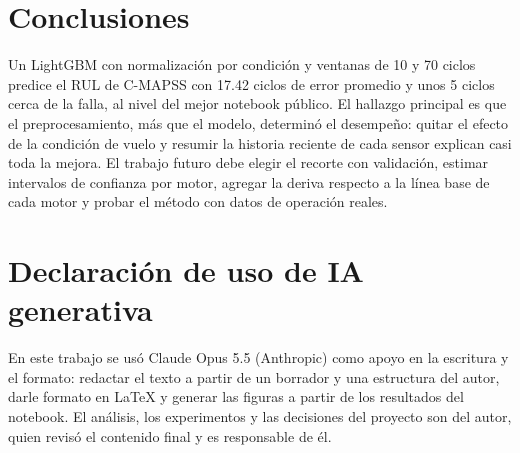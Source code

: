 \documentclass[conference]{IEEEtran}
\begin{document}
\section{Conclusiones}

Un LightGBM con normalización por condición y ventanas de 10 y 70 ciclos predice el RUL de C-MAPSS con 17.42 ciclos de error promedio y unos 5 ciclos cerca de la falla, al nivel del mejor notebook público. El hallazgo principal es que el preprocesamiento, más que el modelo, determinó el desempeño: quitar el efecto de la condición de vuelo y resumir la historia reciente de cada sensor explican casi toda la mejora. El trabajo futuro debe elegir el recorte con validación, estimar intervalos de confianza por motor, agregar la deriva respecto a la línea base de cada motor y probar el método con datos de operación reales.

\section*{Declaración de uso de IA generativa}
En este trabajo se usó Claude Opus 5.5 (Anthropic) como apoyo en la escritura y el formato: redactar el texto a partir de un borrador y una estructura del autor, darle formato en LaTeX y generar las figuras a partir de los resultados del notebook. El análisis, los experimentos y las decisiones del proyecto son del autor, quien revisó el contenido final y es responsable de él.
\end{document}
